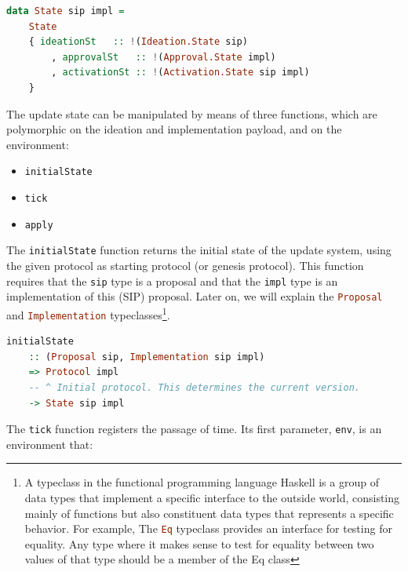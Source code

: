 \begin{lstlisting}[language=Haskell]
	data State sip impl =
	State
	{ ideationSt   :: !(Ideation.State sip)
		, approvalSt   :: !(Approval.State impl)
		, activationSt :: !(Activation.State sip impl)
	}
\end{lstlisting}

The update state can be manipulated by means of three functions, which are
polymorphic on the ideation and implementation payload, and on the environment:
\begin{itemize}
	\item \lstinline[language=Haskell]!initialState!
	\item \lstinline[language=Haskell]!tick!
	\item \lstinline[language=Haskell]!apply!
\end{itemize}

The \lstinline[language=Haskell]!initialState! function returns the initial 
state of the update
system, using the given protocol as starting protocol (or genesis protocol).
This function requires that the \lstinline[language=Haskell]!sip! type is a 
proposal and that the
\lstinline[language=Haskell]!impl! type is an implementation of this (SIP) 
proposal. Later on, we
will explain the \lstinline[language=Haskell]!Proposal! and 
\lstinline[language=Haskell]!Implementation! typeclasses\footnote{A typeclass 
	in the functional programming language Haskell is a group of data types 
	that 
	implement a specific interface to the outside world, consisting mainly of 
	functions but also constituent data types that represents a specific 
	behavior. 
	For example, The \lstinline[language=Haskell]!Eq! typeclass provides an 
	interface for testing for equality. Any type where it makes sense to test 
	for 
	equality between two values of that type should be a member of the Eq 
	class}.

\begin{lstlisting}[language=Haskell]
	initialState
	:: (Proposal sip, Implementation sip impl)
	=> Protocol impl
	-- ^ Initial protocol. This determines the current version.
	-> State sip impl
\end{lstlisting}

The \lstinline[language=Haskell]!tick! function registers the passage of time. 
Its first
parameter, \lstinline[language=Haskell]!env!, is an environment that:

